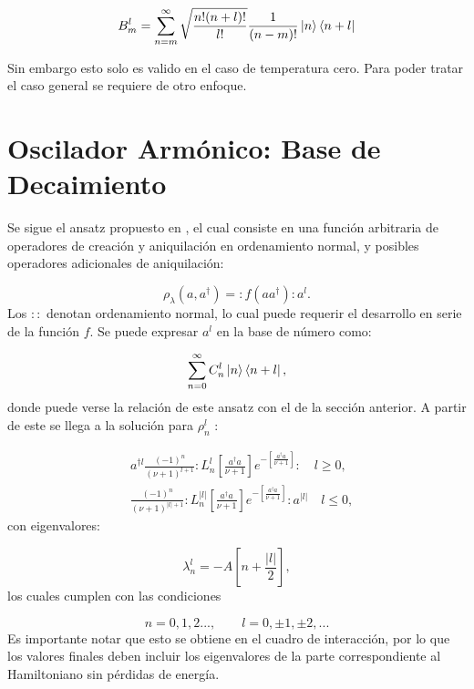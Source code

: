 \documentclass[a4paper,10pt]{report}
\begin{document}
\begin{equation}
B_m^l = \sum_{n=m}^\infty \sqrt{\frac{n!(n+l)!}{l!}}\frac{1}{(n-m)!}\Ket{n}\Bra{n+l}
\end{equation}

Sin embargo esto solo es valido en el caso de temperatura cero. Para poder tratar el caso general se requiere de otro enfoque.

\section{Oscilador Armónico: Base de Decaimiento}

Se sigue el ansatz propuesto en \cite{EnglertDB}, el cual consiste en una función arbitraria de operadores de creación y aniquilación en ordenamiento normal, y posibles operadores adicionales de aniquilación:

\begin{equation}\label{Englert1993}
\rho_\lambda (a,a^\dagger) = :f(aa^\dagger):a^l.
\end{equation} Los $::$ denotan ordenamiento normal, lo cual puede requerir el desarrollo en serie de la función $f$. Se puede expresar $a^l$ en la base de número como:

\begin{equation}
\sum_{n=0}^\infty C_n^l\Ket{n}\Bra{n+l},
\end{equation} donde puede verse la relación de este ansatz con el de la sección anterior. A partir de este se llega a la solución para $\rho_n^l$ \cite{EnglertDB}:

\begin{align}\label{DefDB}
&a^{\dagger l}\frac{(-1)^n}{(\nu+1)^{l+1}}:L_n^l[\frac{a^\dagger a}{\nu+1}]e^{-[\frac{a^\dagger a}{\nu+1}]}:\quad l \geq 0, \\
&\frac{(-1)^n}{(\nu+1)^{|l|+1}}:L_n^{|l|}[\frac{a^\dagger a}{\nu+1}]e^{-[\frac{a^\dagger a}{\nu+1}]}:a^{|l|}\quad l \leq 0,
\end{align} con eigenvalores:

\begin{equation}
\lambda_n^l = -A[n + \frac{|l|}{2}],
\end{equation} los cuales cumplen con las condiciones

\begin{equation}
n=0,1,2...,\qquad l = 0,\pm 1, \pm 2,... 
\end{equation}Es importante notar que esto se obtiene en el cuadro de interacción, por lo que los valores finales deben incluir los eigenvalores de la parte correspondiente al Hamiltoniano sin pérdidas de energía.
\end{document}

